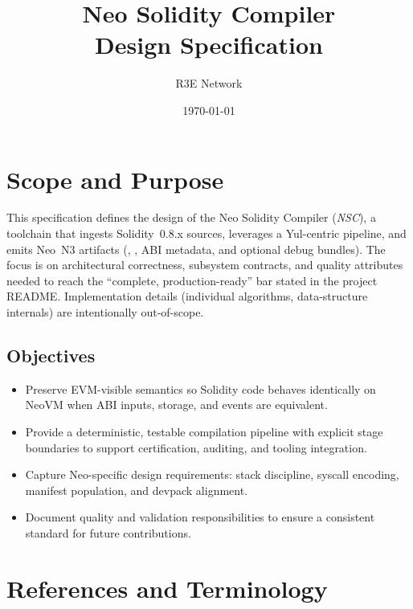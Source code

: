\documentclass[11pt]{article}
\title{\textbf{Neo Solidity Compiler\\Design Specification}}
\author{R3E Network}
\date{\today}
\begin{document}
\maketitle
\tableofcontents

\section{Scope and Purpose}
This specification defines the design of the Neo Solidity Compiler (\emph{NSC}), a toolchain that ingests Solidity~0.8.x sources, leverages a Yul-centric pipeline, and emits Neo~N3 artifacts (, , ABI metadata, and optional debug bundles). The focus is on architectural correctness, subsystem contracts, and quality attributes needed to reach the ``complete, production-ready'' bar stated in the project README. Implementation details (individual algorithms, data-structure internals) are intentionally out-of-scope.

\subsection{Objectives}
\begin{itemize}
    \item Preserve EVM-visible semantics so Solidity code behaves identically on NeoVM when ABI inputs, storage, and events are equivalent.
    \item Provide a deterministic, testable compilation pipeline with explicit stage boundaries to support certification, auditing, and tooling integration.
    \item Capture Neo-specific design requirements: stack discipline, syscall encoding, manifest population, and devpack alignment.
    \item Document quality and validation responsibilities to ensure a consistent standard for future contributions.
\end{itemize}

\section{References and Terminology}
\end{document}
